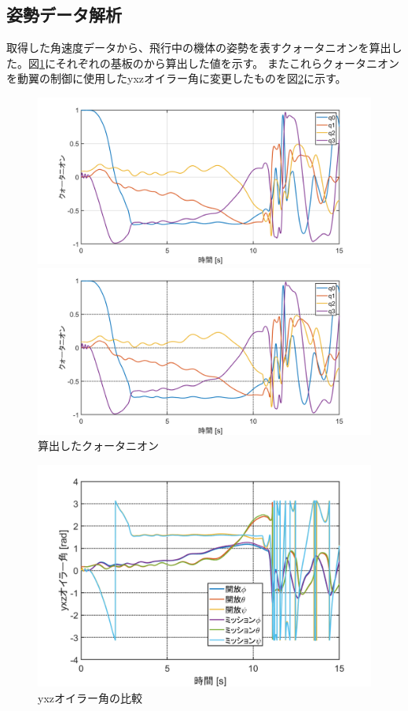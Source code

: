 \documentclass[a4paper,11pt,uplatex]{jsarticle}
\begin{document}
\subsection{姿勢データ解析}
取得した角速度データから、飛行中の機体の姿勢を表すクォータニオンを算出した。図\ref{fig:quatarnionhikaku}にそれぞれの基板のから算出した値を示す。
またこれらクォータニオンを動翼の制御に使用したyxzオイラー角に変更したものを図\ref{fig:oirahikaku}に示す。

\begin{figure}[H]
	\centering
	\begin{minipage}{.85\textwidth}
		\centering
		\includegraphics[width=0.95\linewidth]{pic_sim/qua_no_s.png}
		\hspace{16mm}{\small［1］開放基板}

		\includegraphics[width=0.95\linewidth]{pic_sim/qua_ta_s.png}
		\hspace{16mm}{\small［2］ミッション基板}
	\end{minipage}
	\caption{算出したクォータニオン}
	\label{fig:quatarnionhikaku}
\end{figure}

\begin{figure}[H]
	\centering
	\includegraphics[width=0.65\linewidth]{pic_sim/euler2.png}
	\caption{yxzオイラー角の比較}
	\label{fig:oirahikaku}
\end{figure}
\end{document}
